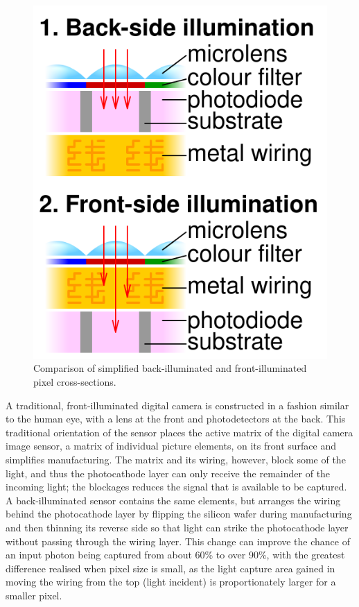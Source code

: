\documentclass[10pt]{article}
\begin{document}
\begin{multicols}{2}
\begin{figure}[H]
    \includegraphics[width=1\linewidth]{Images/Week 2/Comparison_backside_illumination.png}
    \caption{Comparison of simplified back-illuminated and front-illuminated pixel cross-sections.}
\end{figure}
A traditional, front-illuminated digital camera is constructed in a fashion similar to the human eye, with a lens at the front and photodetectors at the back. This traditional orientation of the sensor places the active matrix of the digital camera image sensor, a matrix of individual picture elements, on its front surface and simplifies manufacturing. The matrix and its wiring, however, block some of the light, and thus the photocathode layer can only receive the remainder of the incoming light; the blockages reduces the signal that is available to be captured.
\newline \newline
A back-illuminated sensor contains the same elements, but arranges the wiring behind the photocathode layer by flipping the silicon wafer during manufacturing and then thinning its reverse side so that light can strike the photocathode layer without passing through the wiring layer.
This change can improve the chance of an input photon being captured from about 60\% to over 90\%, with the greatest difference realised when pixel size is small, as the light capture area gained in moving the wiring from the top (light incident) is proportionately larger for a smaller pixel.


\end{multicols}
\end{document}

